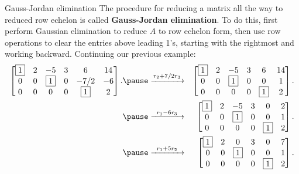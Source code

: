 \begin{frame}{Gauss-Jordan elimination}\footnotesize 
The procedure for reducing a matrix all the way to \alert{reduced row echelon} is called {\bf Gauss-Jordan elimination}. \pause To do this, first perform Gaussian elimination to reduce $A$ to row echelon form, then use row operations to clear the entries \alert{above} leading 1's, starting with the rightmost and working backward. 
\bpause
Continuing our previous example:
\begin{eqnarray*}
\begin{bmatrix}
\boxed{1}&2&-5&3&6&14\\
0&0&\boxed{1}&0&-7/2&-6\\
0&0&0&0&\boxed{1}&2
\end{bmatrix}.
\pause&\xrightarrow[\hspace{35pt}]{r_2+7/2r_3}&
\begin{bmatrix}
\boxed{1}&2&-5&3&6&14\\
0&0&\boxed{1}&0&0&1\\
0&0&0&0&\boxed{1}&2
\end{bmatrix}.
\\
\pause&\xrightarrow[\hspace{35pt}]{r_1-6r_3}&
\begin{bmatrix}
\boxed{1}&2&-5&3&0&2\\
0&0&\boxed{1}&0&0&1\\
0&0&0&0&\boxed{1}&2
\end{bmatrix}.
\\
\pause&\xrightarrow[\hspace{35pt}]{r_1+5r_2}&
\begin{bmatrix}
\boxed{1}&2&0&3&0&7\\
0&0&\boxed{1}&0&0&1\\
0&0&0&0&\boxed{1}&2
\end{bmatrix}.
\end{eqnarray*}
\end{frame}
